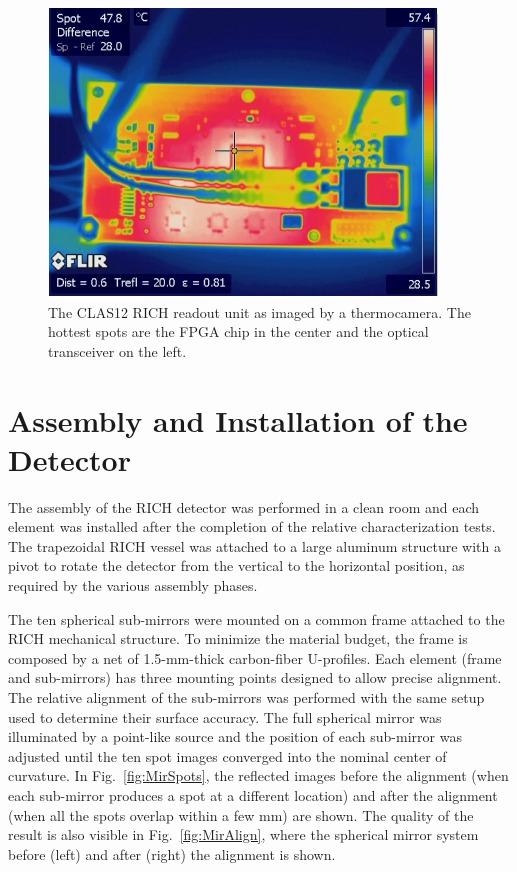 \documentclass[5p,times,twocolumn]{elsarticle}
\begin{document}
\begin{figure}[t]
\begin{center}
\includegraphics[width=0.70\columnwidth]{FPGA_heat.pdf}
\end{center}
\caption{The CLAS12 RICH readout unit as imaged by a thermocamera. The hottest spots are the FPGA chip in the
  center and the optical transceiver on the left.}
\label{Fig:EleTile}
\end{figure}

\section{Assembly and Installation of the Detector}

The assembly of the RICH detector was performed in a clean room and each element was installed after the completion
of the relative characterization tests. The trapezoidal RICH vessel was attached to a large aluminum structure with a
pivot to rotate the detector from the vertical to the horizontal position, as required by the various assembly phases.

The ten spherical sub-mirrors were mounted on a common frame attached to the RICH mechanical structure. To
minimize the material budget, the frame is composed by a net of 1.5-mm-thick carbon-fiber U-profiles. Each element
(frame and sub-mirrors) has three mounting points designed to allow precise alignment. The relative alignment of
the sub-mirrors was performed with the same setup used to determine their surface accuracy. The full spherical
mirror was illuminated by a point-like source and the position of each sub-mirror was adjusted until the ten spot images
converged into the nominal center of curvature. In Fig.~\ref{fig:MirSpots}, the reflected images before the alignment
(when each sub-mirror produces a spot at a different location) and after the alignment (when all the spots overlap
within a few mm) are shown. The quality of the result is also visible in Fig.~\ref{fig:MirAlign}, where the spherical
mirror system before (left) and after (right) the alignment is shown.
\end{document}
